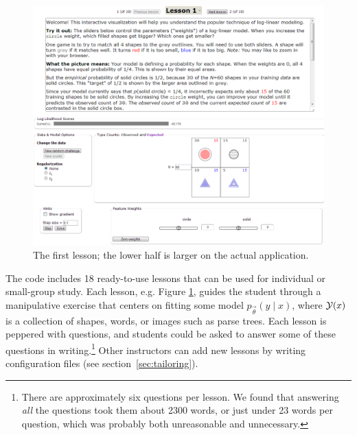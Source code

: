 \documentclass[11pt,letterpaper]{article}
\newcommand{\Note}[1]{}
\renewcommand{\Note}[1]{\hl{[#1]}}
\newcommand{\NoteSigned}[3]{{\sethlcolor{#2}\Note{#1: #3}}}
\newcommand{\NoteFF}[1]{\NoteSigned{FF}{LightBlue}{#1}}
\newcommand{\NoteJE}[1]{\NoteSigned{JE}{LightGreen}{#1}}
\newcommand{\Commented}[1]{}
\newcommand{\NumLessons}[0]{18}%
\begin{document}
\begin{figure}
\centering
\includegraphics[scale=.49]{images/lesson1-051313-intro-zoom-instmore.PNG}
\caption{The first lesson; the lower half is larger on the actual application.}
\label{fig:lesson1}
\end{figure}


The code includes \NumLessons{} ready-to-use lessons that can be used
for individual or small-group study.  Each lesson, e.g. Figure \ref{fig:lesson1}, guides the student
through a manipulative exercise that centers on fitting some model
$p_{\vec{\theta}}(y \mid x)$, where ${\cal Y}(x)$ is a collection of
shapes, words, or images such as parse trees.  Each lesson is peppered
with questions, and students could be asked to answer some of these
questions in writing.\footnote{There are approximately six questions per
lesson. We found that answering {\em all} the
  questions took them about 2300 words, or just under 23 words per question, which
  was probably both unreasonable and unnecessary.}
\Commented{\NoteJE{We might
  consider releasing a couple of pencil-and-paper problems from past
  exams.}}  Other instructors can add new lessons by writing 
configuration files (see section~\ref{sec:tailoring}).

\Commented{\NoteJE{However, I
  think it would be helpful (maybe in the final version?) to list
  other people's NLP homework assignments or practical exercises that
  use maxent.  I bet you could find a few good assignments on the web,
  including in the NLTK book.}}
\end{document}
